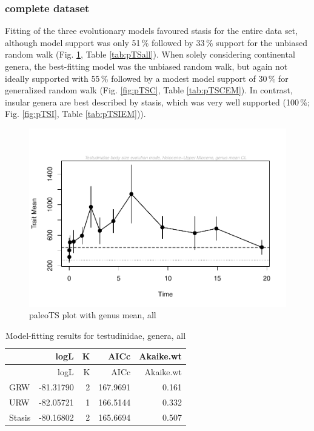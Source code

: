 \subsubsection{complete dataset}\label{all-continental-and-insular}

Fitting of the three evolutionary models favoured stasis for the entire data set, although model support was only 51\,\% followed by 33\,\% support for the unbiased random walk (Fig. \ref{fig:pTSall}, Table \ref{tab:pTSall}). When solely considering continental genera, the best-fitting model was the unbiased random walk, but again not ideally supported with 55\,\% followed by a modest model support of 30\,\% for generalized random walk (Fig. \ref{fig:pTSC}, Table \ref{tab:pTSCEM}). In contrast, insular genera are best described by stasis, which was very well supported (100\,\%; Fig. \ref{fig:pTSI}, Table \ref{tab:pTSIEM})). 


\begin{figure}[H]
	\centering
	\includegraphics{MA_JJ_files/figure-latex/paleoTSAll-1.pdf}
	\caption{paleoTS plot with genus mean, all}
	\label{fig:pTSall}
\end{figure}

\begin{longtable}[]{@{}lrrrr@{}}
	\caption{Model-fitting results for testudinidae, genera,
		all}
	\label{tab:pTSallEM}\tabularnewline
	\toprule
	& logL & K & AICc & Akaike.wt\tabularnewline
	\midrule
	\endfirsthead
	\toprule
	& logL & K & AICc & Akaike.wt\tabularnewline
	\midrule
	\endhead
	GRW & -81.31790 & 2 & 167.9691 & 0.161\tabularnewline
	URW & -82.05721 & 1 & 166.5144 & 0.332\tabularnewline
	Stasis & -80.16802 & 2 & 165.6694 & 0.507\tabularnewline
	\bottomrule
\end{longtable}

